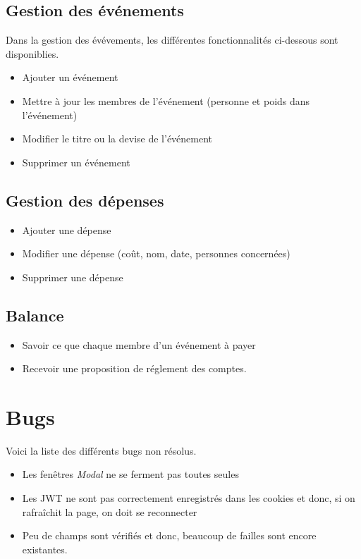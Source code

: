 \documentclass[a4paper]{report}
\begin{document}
\subsection{Gestion des événements}
Dans la gestion des évévements, les différentes fonctionnalités ci-dessous sont disponiblies.
\begin{itemize}
\item Ajouter un événement
\item Mettre à jour les membres de l'événement (personne et poids dans l'événement)
\item Modifier le titre ou la devise de l'événement
\item Supprimer un événement
\end{itemize}

\subsection{Gestion des dépenses}
\begin{itemize}
\item Ajouter une dépense
\item Modifier une dépense (coût, nom, date, personnes concernées)
\item Supprimer une dépense
\end{itemize}

\subsection{Balance}
\begin{itemize}
\item Savoir ce que chaque membre d'un événement à payer
\item Recevoir une proposition de réglement des comptes.
\end{itemize}

\section{Bugs}
Voici la liste des différents bugs non résolus.
\begin{itemize}
\item Les fenêtres \textit{Modal} ne se ferment pas toutes seules
\item Les JWT ne sont pas correctement enregistrés dans les cookies et donc, si on rafraîchit la page, on doit se reconnecter
\item Peu de champs sont vérifiés et donc, beaucoup de failles sont encore existantes.
\end{itemize}
\end{document}
